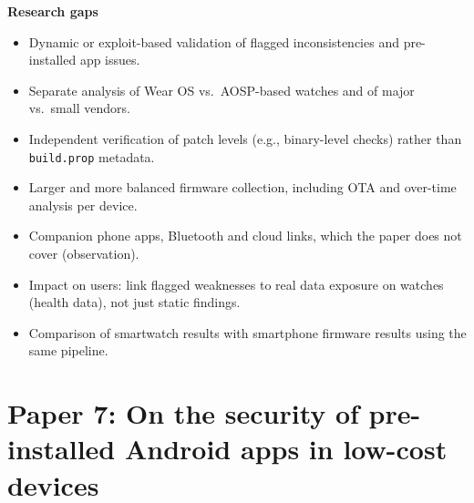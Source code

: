 \documentclass[11pt,a4paper]{article}
\begin{document}
\begin{enumerate}
    \vspace{4pt}
    \textbf{Research gaps}
    \begin{itemize}[leftmargin=*,itemsep=1pt,topsep=2pt]
        \item Dynamic or exploit-based validation of flagged inconsistencies and pre-installed app issues.
        \item Separate analysis of Wear OS vs.\ AOSP-based watches and of major vs.\ small vendors.
        \item Independent verification of patch levels (e.g., binary-level checks) rather than \texttt{build.prop} metadata.
        \item Larger and more balanced firmware collection, including OTA and over-time analysis per device.
        \item Companion phone apps, Bluetooth and cloud links, which the paper does not cover (observation).
        \item Impact on users: link flagged weaknesses to real data exposure on watches (health data), not just static findings.
        \item Comparison of smartwatch results with smartphone firmware results using the same pipeline.
    \end{itemize}

\end{enumerate}

\newpage

\section{Paper 7: On the security of pre-installed Android apps in low-cost devices}
\end{document}
